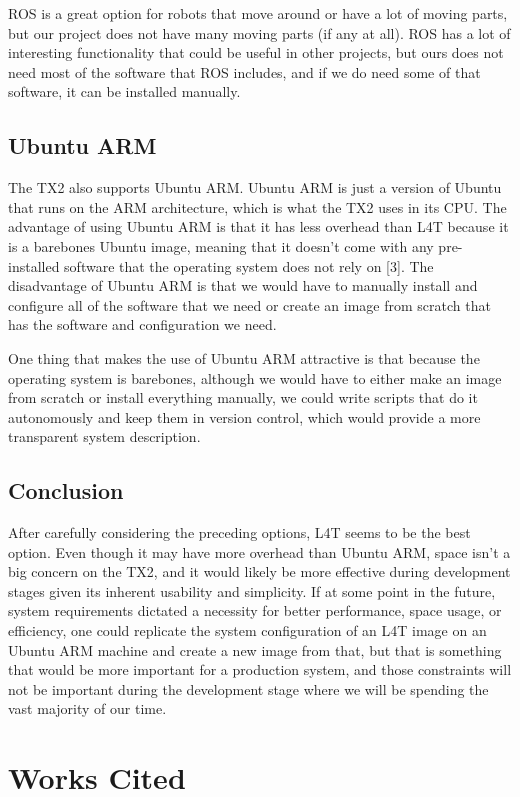 \documentclass[letterpaper,10pt,serif,draftclsnofoot,onecolumn,compsoc,titlepage]{IEEEtran}
\begin{document}
ROS is a great option for robots that move around or have a lot of moving parts, but our project does not have many moving parts (if any at all). ROS has a lot of interesting functionality that could be useful in other projects, but ours does not need most of the software that ROS includes, and if we do need some of that software, it can be installed manually.

\subsection{Ubuntu ARM}
The TX2 also supports Ubuntu ARM. Ubuntu ARM is just a version of Ubuntu that runs on the ARM architecture, which is what the TX2 uses in its CPU. The advantage of using Ubuntu ARM is that it has less overhead than L4T because it is a barebones Ubuntu image, meaning that it doesn't come with any pre-installed software that the operating system does not rely on [3]. The disadvantage of Ubuntu ARM is that we would have to manually install and configure all of the software that we need or create an image from scratch that has the software and configuration we need. 

One thing that makes the use of Ubuntu ARM attractive is that because the operating system is barebones, although we would have to either make an image from scratch or install everything manually, we could write scripts that do it autonomously and keep them in version control, which would provide a more transparent system description.

\subsection{Conclusion}
After carefully considering the preceding options, L4T seems to be the best option. Even though it may have more overhead than Ubuntu ARM, space isn't a big concern on the TX2, and it would likely be more effective during development stages given its inherent usability and simplicity. If at some point in the future, system requirements dictated a necessity for better performance, space usage, or efficiency, one could replicate the system configuration of an L4T image on an Ubuntu ARM machine and create a new image from that, but that is something that would be more important for a production system, and those constraints will not be important during the development stage where we will be spending the vast majority of our time.


\newpage
\section*{Works Cited}
\end{document}
